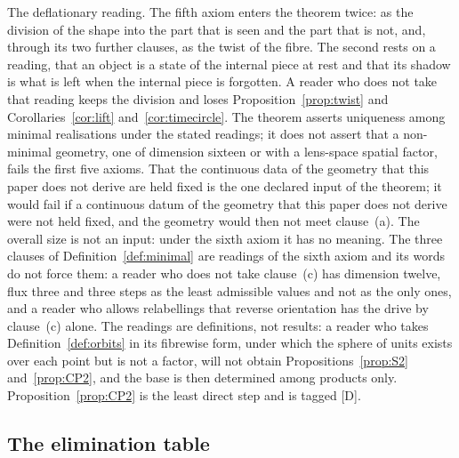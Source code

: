 \documentclass[11pt,a4paper]{article}
\theoremstyle{plain}
\theoremstyle{definition}
\theoremstyle{remark}
\newcommand{\rigD}{[\textup{D}]}
\begin{document}
The deflationary reading. The fifth axiom enters the theorem twice: as the division of the shape into the part that is seen and the part that is not, and, through its two further clauses, as the twist of the fibre. The second rests on a reading, that an object is a state of the internal piece at rest and that its shadow is what is left when the internal piece is forgotten. A reader who does not take that reading keeps the division and loses Proposition~\ref{prop:twist} and Corollaries~\ref{cor:lift} and~\ref{cor:timecircle}. The theorem asserts uniqueness among minimal realisations under the stated readings; it does not assert that a non-minimal geometry, one of dimension sixteen or with a lens-space spatial factor, fails the first five axioms. 
That the continuous data of the geometry that this paper does not derive are held fixed is the one declared input of the theorem; it would fail if a continuous datum of the geometry that this paper does not derive were not held fixed, and the geometry would then not meet clause~(a).
 The overall size is not an input: under the sixth axiom it has no meaning. The three clauses of Definition~\ref{def:minimal} are readings of the sixth axiom and its words do not force them: a reader who does not take clause~(c) has dimension twelve, flux three and three steps as the least admissible values and not as the only ones, and a reader who allows relabellings that reverse orientation has the drive by clause~(c) alone. The readings are definitions, not results: a reader who takes Definition~\ref{def:orbits} in its fibrewise form, under which the sphere of units exists over each point but is not a factor, will not obtain Propositions~\ref{prop:S2} and~\ref{prop:CP2}, and the base is then determined among products only. Proposition~\ref{prop:CP2} is the least direct step and is tagged \rigD.

\subsection{The elimination table}
\end{document}
